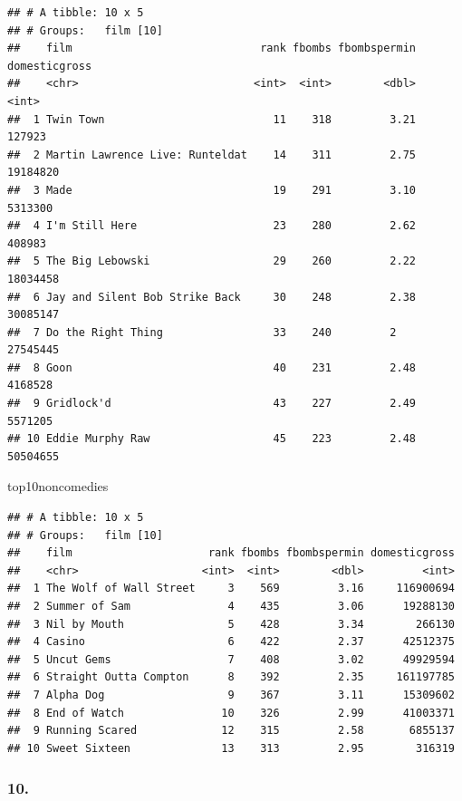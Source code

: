 \documentclass[]{article}
\newenvironment{Shaded}{\begin{snugshade}}{\end{snugshade}}
\newcommand{\NormalTok}[1]{#1}
\begin{document}
\begin{verbatim}
## # A tibble: 10 x 5
## # Groups:   film [10]
##    film                             rank fbombs fbombspermin domesticgross
##    <chr>                           <int>  <int>        <dbl>         <int>
##  1 Twin Town                          11    318         3.21        127923
##  2 Martin Lawrence Live: Runteldat    14    311         2.75      19184820
##  3 Made                               19    291         3.10       5313300
##  4 I'm Still Here                     23    280         2.62        408983
##  5 The Big Lebowski                   29    260         2.22      18034458
##  6 Jay and Silent Bob Strike Back     30    248         2.38      30085147
##  7 Do the Right Thing                 33    240         2         27545445
##  8 Goon                               40    231         2.48       4168528
##  9 Gridlock'd                         43    227         2.49       5571205
## 10 Eddie Murphy Raw                   45    223         2.48      50504655
\end{verbatim}

\begin{Shaded}
\begin{Highlighting}[]
\NormalTok{top10noncomedies}
\end{Highlighting}
\end{Shaded}

\begin{verbatim}
## # A tibble: 10 x 5
## # Groups:   film [10]
##    film                     rank fbombs fbombspermin domesticgross
##    <chr>                   <int>  <int>        <dbl>         <int>
##  1 The Wolf of Wall Street     3    569         3.16     116900694
##  2 Summer of Sam               4    435         3.06      19288130
##  3 Nil by Mouth                5    428         3.34        266130
##  4 Casino                      6    422         2.37      42512375
##  5 Uncut Gems                  7    408         3.02      49929594
##  6 Straight Outta Compton      8    392         2.35     161197785
##  7 Alpha Dog                   9    367         3.11      15309602
##  8 End of Watch               10    326         2.99      41003371
##  9 Running Scared             12    315         2.58       6855137
## 10 Sweet Sixteen              13    313         2.95        316319
\end{verbatim}

\hypertarget{section-9}{%
\subsubsection{10.}\label{section-9}}
\end{document}
